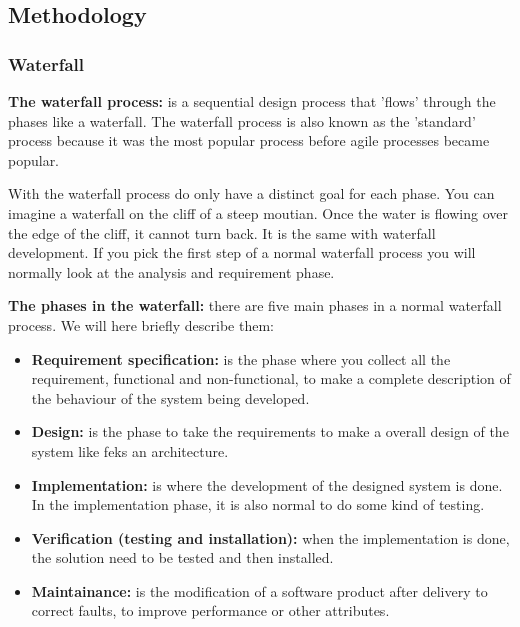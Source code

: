 \subsection{Methodology}

\subsubsection{Waterfall}

{\bf The waterfall process: } is a sequential design process that 'flows' through the phases like a waterfall.
The waterfall process is also known as the 'standard' process because it was the most popular process before
agile processes became popular. 

With the waterfall process do only have a distinct goal for each phase. You can imagine a waterfall on the cliff of a steep moutian. Once the water is flowing over the edge of the cliff, it cannot turn back. It is the same with waterfall development. If you pick the first step of a normal waterfall process you will normally look at the analysis and requirement phase.

{\bf The phases in the waterfall:} there are five main phases in a normal waterfall process. We will here briefly
describe them:
\begin{itemize}
	\item {\bf Requirement specification:} is the phase where you collect all the requirement, functional and non-functional, to make a complete description of the behaviour of the system being developed.
	\item {\bf Design: } is the phase to take the requirements to make a overall design of the system like feks an
	architecture.
	\item {\bf Implementation: } is where the development of the designed system is done. In the implementation phase, 
	it is also normal to do some kind of testing.
	\item {\bf Verification (testing and installation): } when the implementation is done, the solution need to be tested and then installed.
	\item {\bf Maintainance: } is the modification of a software product after delivery to correct faults, to improve performance or other attributes.
\end{itemize}

